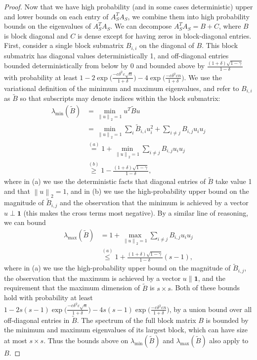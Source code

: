 \documentclass{article} %
\newcommand{\twonorm}[1]{\left\|#1\right\|_{2}}
\newcommand{\n}{\ensuremath{n}}
\newcommand{\1}{\ensuremath{{\sf (i)}}}
\newcommand{\2}{\ensuremath{{\sf (ii)}}}
\newcommand{\3}{\ensuremath{{\sf (iii)}}}
\newcommand{\4}{\ensuremath{{\sf (iv)}}}
\newcommand{\5}{\ensuremath{{\sf (v)}}}
\newcommand{\6}{\ensuremath{{\sf (vi)}}}
\begin{document}
\begin{proof}
Now that we have high probability (and in some cases deterministic) upper and lower bounds on each entry of $A_S^TA_S$, we combine them into high probability bounds on the eigenvalues of $A_S^TA_S$. We can decompose $A_S^TA_S = B + C$, where $B$ is block diagonal and $C$ is dense except for having zeros in block-diagonal entries.
First, consider a single block submatrix $B_{i,i}$ on the diagonal of $B$. This block submatrix has diagonal values deterministically 1, and off-diagonal entries bounded deterministically from below by 0 and bounded above by $\frac{(1+\delta)\sqrt{1-\gamma}}{1-\delta} $
with probability at least $1 - 2\exp{\big(\frac{-c\delta^2\varepsilon\sqrt{\n}}{1+\delta}\big)} - 4\exp{\big(\frac{-c\delta^2\varepsilon\n}{1+\delta}\big)}$. 
We use the variational definition of the minimum and maximum eigenvalues, and refer to $B_{i,i}$ as $\tilde B$ so that subscripts may denote indices within the block submatrix:
\begin{align*}
    \lambda_\text{min}(\tilde B) &= \min_{\twonorm{u} = 1}u^T\tilde Bu \\
    &= \min_{\twonorm{u} = 1}\sum_{i}\tilde B_{i,i}u_i^2 + \sum_{i\neq j}B_{i,j}u_iu_j \\
    &\overset{(a)}= 1+ \min_{\twonorm{u} = 1}\sum_{i\neq j}B_{i,j}u_iu_j \\
    &\overset{(b)}{\geq} 1 - \frac{(1+\delta)\sqrt{1-\gamma}}{1-\delta} ,
\end{align*}
where in (a) we use the deterministic facts that diagonal entries of $\tilde B$ take value 1 and that $\twonorm{u}=1$, and in (b) we use the high-probability upper bound on the magnitude of $\tilde B_{i,j}$ and the observation that the minimum is achieved by a vector $u \perp \mathbf{1}$ (this makes the cross terms most negative). By a similar line of reasoning, we can bound 
\begin{align*}
    \lambda_\text{max}(\tilde B) &= 1+ \max_{\twonorm{u} = 1}\sum_{i\neq j}B_{i,j}u_iu_j \\
    &\overset{(a)}{\leq} 1 + \frac{(1+\delta)\sqrt{1-\gamma}}{1-\delta}(s-1) ,
\end{align*}
where in (a) we use the high-probability upper bound on the magnitude of $\tilde B_{i,j}$, the observation that the maximum is achieved by a vector $u \parallel \mathbf{1}$, and the requirement that the maximum dimension of $\tilde B$ is $s \times s$. Both of these bounds hold with probability at least $1 - 2s(s-1)\exp{\big(\frac{-c\delta^2\varepsilon\sqrt{\n}}{1+\delta}\big)} - 4s(s-1)\exp{\big(\frac{-c\delta^2\varepsilon\n}{1+\delta}\big)}$, by a union bound over all off-diagonal entries in $\tilde B$.
The spectrum of the full block matrix $B$ is bounded by the minimum and maximum eigenvalues of its largest block, which can have size at most $s \times s$. Thus the bounds above on $\lambda_\text{min}(\tilde B)$ and $\lambda_\text{max}(\tilde B)$ also apply to $B$.


\end{proof}
\end{document}
